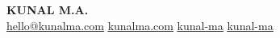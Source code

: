 \begin{center}
    \textbf{\Huge \scshape KUNAL M.A.} \\ \vspace{10pt}
    \small
    \href{mailto:hello@kunalma.com}{ \underline{hello@kunalma.com}} \quad
    \href{https://kunalma.com}{ \underline{kunalma.com}} \quad
    \href{https://www.linkedin.com/in/kunal-ma}{ \underline{kunal-ma}} \quad
    \href{https://github.com/kunal-ma}{ \underline{kunal-ma}} \\ \vspace{3pt}
\end{center}
